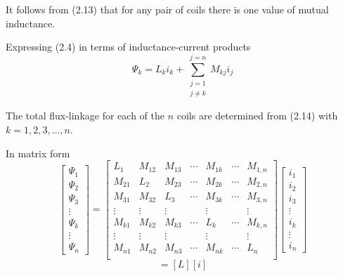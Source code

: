 \documentclass[a4paper,numbers=noenddot,12pt]{scrbook}
\begin{document}
        It follows from (2.13) that for any pair of coils there is one value of mutual inductance.

        Expressing (2.4) in terms of inductance-current products
        \begin{equation}
            \varPsi_k = L_k i_k + \sum_{\substack{j = 1\\j \neq k}}^{j=n} M_{kj}i_j
            \label{eq:Eq2.14}
        \end{equation}

        The total flux-linkage for each of the $n$ coils are determined from (2.14) with $k = 1,2,3,\dotsc, n$.

        In matrix form
        \begin{equation}
            \begin{bmatrix}
                \varPsi_1 \\[1ex] \varPsi_2 \\[1ex] \varPsi_3 \\[1ex] \vdots \\[1ex] \varPsi_k \\[1ex] \vdots \\[1ex] \varPsi_n
            \end{bmatrix}
            =
            \begin{bmatrix}
                L_1 & M_{12} & M_{13} & \cdots & M_{1k} & \cdots & M_{1,n} \\[1ex]
                M_{21} & L_{2} & M_{23} & \cdots & M_{2k} & \cdots & M_{2,n} \\[1ex]
                M_{31} & M_{32} & L_{3} & \cdots & M_{3k} & \cdots & M_{3,n} \\[1ex]
                \vdots & \vdots & \vdots &  &\vdots &  & \vdots \\[1ex]
                M_{k1} & M_{k2} & M_{k3} & \cdots & L_{k} & \cdots & M_{k,n} \\[1ex]
                \vdots & \vdots & \vdots &  &\vdots &  & \vdots \\[1ex]
                M_{n1} & M_{n2} & M_{n3} & \cdots & M_{nk} & \cdots & L_{n} \\
            \end{bmatrix}
            \begin{bmatrix}
                i_1 \\[1ex] i_2 \\[1ex] i_3 \\[1ex] \vdots \\[1ex] i_k \\[1ex] \vdots \\[1ex] i_n
            \end{bmatrix}
            \label{eq:Eq2.15}
        \end{equation}
        \begin{equation}
            [\varPsi] = [L][i]
            \label{eq:Eq2.16}
        \end{equation}
\end{document}
